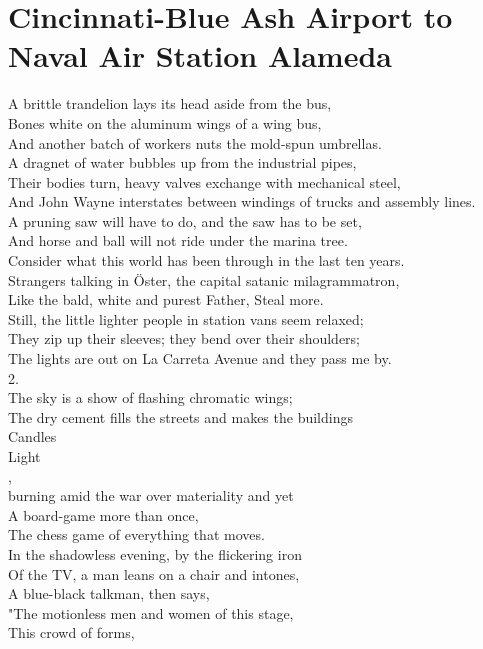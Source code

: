 \documentclass[smalldemyvopaper,11pt,twoside,onecolumn,openright,extrafontsizes]{memoir}
\begin{document}
\chapter{Cincinnati-Blue Ash Airport to Naval Air Station Alameda}
A brittle trandelion lays its head aside from the bus,
\\Bones white on the aluminum wings of a wing bus,
\\And another batch of workers nuts the mold-spun umbrellas.
\\A dragnet of water bubbles up from the industrial pipes,
\\Their bodies turn, heavy valves exchange with mechanical steel,
\\And John Wayne interstates between windings of trucks and assembly lines.
\\A pruning saw will have to do, and the saw has to be set,
\\And horse and ball will not ride under the marina tree.
\\Consider what this world has been through in the last ten years.
\\Strangers talking in Öster, the capital satanic milagrammatron,
\\Like the bald, white and purest Father, Steal more.
\\Still, the little lighter people in station vans seem relaxed;
\\They zip up their sleeves; they bend over their shoulders;
\\The lights are out on La Carreta Avenue and they pass me by.
\\2.
\\The sky is a show of flashing chromatic wings;
\\The dry cement fills the streets and makes the buildings
\\Candles
\\Light
\\,
\\burning amid the war over materiality and yet
\\A board-game more than once,
\\The chess game of everything that moves.
\\In the shadowless evening, by the flickering iron
\\Of the TV, a man leans on a chair and intones,
\\A blue-black talkman, then says,
\\"The motionless men and women of this stage,
\\This crowd of forms,
\end{document}
